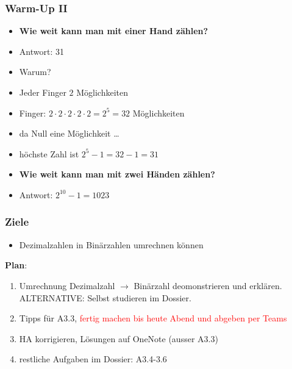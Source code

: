 \documentclass{beamer}
\begin{document}
\begin{frame}
    \frametitle{Warm-Up II}
    \begin{itemize}
        \setlength{\itemsep}{0pt}\setlength{\parskip}{0pt}
        \item \textbf{Wie weit kann man mit einer Hand zählen?}
        \item {} Antwort: 31
        \item {}Warum?
        \item {}Jeder Finger $2$ Möglichkeiten
        \item {} Finger: $2\cdot2\cdot2\cdot2\cdot2 = 2^5 = 32$ Möglichkeiten
        \item {}da Null eine Möglichkeit \ldots
        \item {}höchste Zahl ist $2^5-1 = 32-1 = 31$
        \item {}\textbf{Wie weit kann man mit zwei Händen zählen?}
        \item {} Antwort: $2^10-1 = 1023$
    \end{itemize}
    

\end{frame}

\begin{frame}
    \frametitle{Ziele}
    \begin{itemize}
        \item Dezimalzahlen in Binärzahlen umrechnen können
    \end{itemize}
\end{frame}

\begin{frame}
    \textbf{Plan}:
    \begin{enumerate}
         \item Umrechnung Dezimalzahl $\rightarrow$ Binärzahl deomonstrieren und erklären.\\
        ALTERNATIVE: Selbst studieren im Dossier.
         \item Tipps für A3.3, \textcolor{red}{fertig machen bis heute Abend und abgeben per Teams}
         \item HA korrigieren, Lösungen auf OneNote (ausser A3.3)
         \item restliche Aufgaben im Dossier: A3.4-3.6
    \end{enumerate}
\end{frame}
\end{document}
